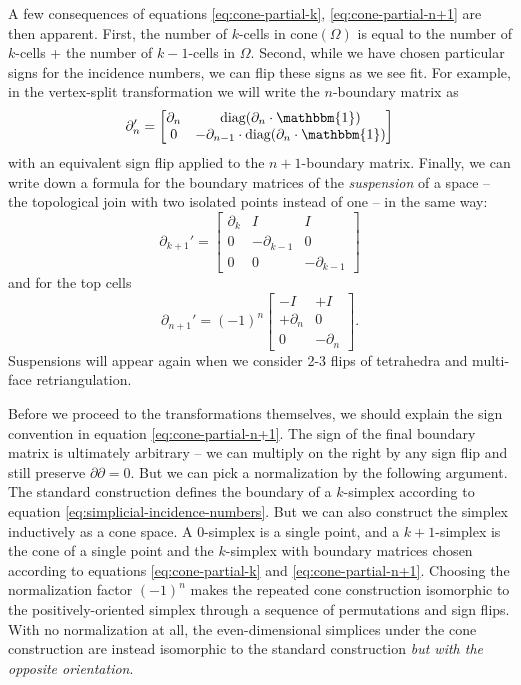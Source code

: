 \documentclass[twocolumn,leqno,twocolumn]{article}
\begin{document}
A few consequences of equations \eqref{eq:cone-partial-k}, \eqref{eq:cone-partial-n+1} are then apparent.
First, the number of $k$-cells in $\text{cone}(\Omega)$ is equal to the number of $k$-cells + the number of $k - 1$-cells in $\Omega$.
Second, while we have chosen particular signs for the incidence numbers, we can flip these signs as we see fit.
For example, in the vertex-split transformation we will write the $n$-boundary matrix as
\begin{equation}
    \partial_n' = \left[\begin{matrix}\partial_n & \text{diag}(\partial_n\cdot\mathbbm{1}) \\ 0 & -\partial_{n - 1}\cdot\text{diag}(\partial_n\cdot\mathbbm{1})\end{matrix}\right]
\end{equation}
with an equivalent sign flip applied to the $n + 1$-boundary matrix.
Finally, we can write down a formula for the boundary matrices of the \emph{suspension} of a space -- the topological join with two isolated points instead of one -- in the same way:
\begin{equation}
    \partial_{k + 1}' = \left[\begin{matrix}\partial_k & I & I \\ 0 & -\partial_{k - 1} & 0 \\ 0 & 0 & -\partial_{k - 1}\end{matrix}\right]
    \label{eq:suspension-partial-k}
\end{equation}
and for the top cells
\begin{equation}
    \partial_{n + 1}' = (-1)^n\left[\begin{matrix}-I & +I \\ +\partial_n & 0 \\ 0 & -\partial_n\end{matrix}\right].
    \label{eq:suspension-partial-n+1}
\end{equation}
Suspensions will appear again when we consider 2-3 flips of tetrahedra and multi-face retriangulation.

Before we proceed to the transformations themselves, we should explain the sign convention in equation \eqref{eq:cone-partial-n+1}.
The sign of the final boundary matrix is ultimately arbitrary -- we can multiply on the right by any sign flip and still preserve $\partial\partial = 0$.
But we can pick a normalization by the following argument.
The standard construction defines the boundary of a $k$-simplex according to equation \eqref{eq:simplicial-incidence-numbers}.
But we can also construct the simplex inductively as a cone space.
A 0-simplex is a single point, and a $k + 1$-simplex is the cone of a single point and the $k$-simplex with boundary matrices chosen according to equations \eqref{eq:cone-partial-k} and \eqref{eq:cone-partial-n+1}.
Choosing the normalization factor $(-1)^n$ makes the repeated cone construction isomorphic to the positively-oriented simplex through a sequence of permutations and sign flips.
With no normalization at all, the even-dimensional simplices under the cone construction are instead isomorphic to the standard construction \emph{but with the opposite orientation}.
\end{document}
